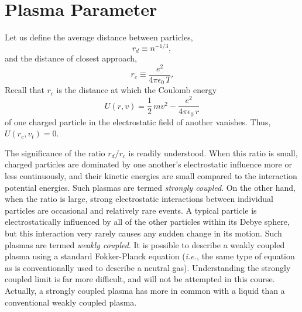 \section{Plasma Parameter}\label{s1.7}
Let us define the average distance between particles,
\begin{equation}\label{e1.16}
r_d \equiv n^{-1/3},
\end{equation}
and the distance of closest approach,
\begin{equation}\label{e1.17}
r_c\equiv \frac{e^2}{4\pi\epsilon_0\, T} .
\end{equation}
Recall that $r_c$ is the distance at which the Coulomb energy
\begin{equation}
U(r,v) = \frac{1}{2}\, mv^2 - \frac{e^2}{4\pi\epsilon_0 \,r}
\end{equation}
of one charged particle in the electrostatic field of another vanishes.
Thus, $U(r_c,v_t) = 0$. 

The significance of the ratio $r_d/r_c$ is readily understood. When this
ratio is small, charged particles are dominated by one another's electrostatic
influence more or less continuously, and their kinetic energies are small
compared to the interaction potential energies. Such plasmas are termed
{\em strongly coupled}. On the other hand, when the ratio is large,
strong electrostatic interactions between individual particles are
occasional and relatively rare events. A typical particle
is electrostatically influenced by all of the other particles within its
Debye sphere, but this interaction very rarely causes any sudden change in its motion.
Such plasmas are termed {\em weakly coupled}. It is possible to
describe a weakly coupled plasma using a standard Fokker-Planck equation
 ({\em i.e.}, the same type of equation as is conventionally used to describe a
neutral gas).
Understanding the strongly coupled limit is far more difficult, and will not
be attempted in this course. Actually, a strongly coupled plasma has more in
common with a liquid than a conventional weakly coupled plasma. 


